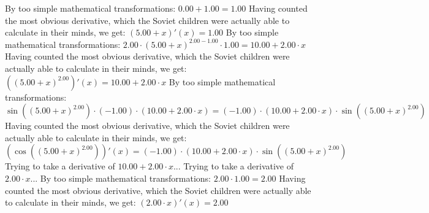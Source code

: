 \documentclass{article}
\begin{document}
By too simple mathematical transformations:
 ${{0.00} + {1.00}} = {1.00}$ 
 \newline
 \newline 
Having counted the most obvious derivative, which the Soviet children were actually able to calculate in their minds, we get:
$({{5.00} + {x}})'(x) = {1.00}$\newline
\newline
By too simple mathematical transformations:
 ${{{2.00} \cdot {\left({{5.00} + {x}}\right) ^ {{2.00} - {1.00}}}} \cdot {1.00}} = {{10.00} + {{2.00} \cdot {x}}}$ 
 \newline
 \newline 
Having counted the most obvious derivative, which the Soviet children were actually able to calculate in their minds, we get:
$({\left({{5.00} + {x}}\right) ^ {2.00}})'(x) = {{10.00} + {{2.00} \cdot {x}}}$\newline
\newline
By too simple mathematical transformations:
 ${{ \sin {\left({\left({{5.00} + {x}}\right) ^ {2.00}}\right)}  \cdot \left({-1.00}\right)} \cdot \left({{10.00} + {{2.00} \cdot {x}}}\right)} = {\left({-1.00}\right) \cdot {\left({{10.00} + {{2.00} \cdot {x}}}\right) \cdot  \sin {\left({\left({{5.00} + {x}}\right) ^ {2.00}}\right)} }}$ 
 \newline
 \newline 
Having counted the most obvious derivative, which the Soviet children were actually able to calculate in their minds, we get:
$( \cos {\left({\left({{5.00} + {x}}\right) ^ {2.00}}\right)} )'(x) = {\left({-1.00}\right) \cdot {\left({{10.00} + {{2.00} \cdot {x}}}\right) \cdot  \sin {\left({\left({{5.00} + {x}}\right) ^ {2.00}}\right)} }}$\newline
\newline
Trying to take a derivative of ${{10.00} + {{2.00} \cdot {x}}}$...\newline
\newline
Trying to take a derivative of ${{2.00} \cdot {x}}$...\newline
\newline
By too simple mathematical transformations:
 ${{2.00} \cdot {1.00}} = {2.00}$ 
 \newline
 \newline 
Having counted the most obvious derivative, which the Soviet children were actually able to calculate in their minds, we get:
$({{2.00} \cdot {x}})'(x) = {2.00}$\newline
\newline
\end{document}
